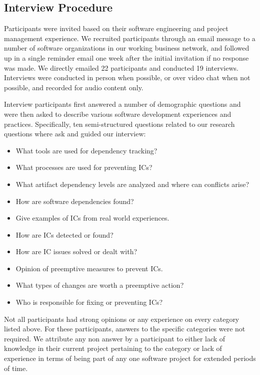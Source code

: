 \documentclass[conference]{IEEEtran}
\begin{document}
\subsection{Interview Procedure}

Participants were invited based on their software engineering and project management experience. We recruited participants through an email message to a number of software organizations in our working business network, and followed up in a single reminder email one week
after the initial invitation if no response was made. We directly emailed 22 participants and  conducted
19 interviews. Interviews were conducted in person when possible, or over video chat when not possible, and recorded for audio content only.


Interview participants first answered a number of demographic questions and were then asked to describe various software development experiences and practices.
Specifically, ten semi-structured questions related to our research questions where ask and guided our interview:

\begin{itemize}
\item What tools are used for dependency tracking?
\item What processes are used for preventing ICs?
\item What artifact dependency levels are analyzed and where can conflicts arise?
\item How are software dependencies found?
\item Give examples of ICs from real world experiences.
\item How are ICs detected or found?
\item How are IC issues solved or dealt with?
\item Opinion of preemptive measures to prevent ICs.
\item What types of changes are worth a preemptive action?
\item Who is responsible for fixing or preventing ICs?
\end{itemize}

Not all participants had strong opinions or any experience on every category listed above. For these participants, answers
to the specific categories were not required. We attribute any non answer by a participant to
either lack of knowledge in their current project pertaining to the category or lack of experience in terms of
being part of any one software project for extended periods of time.
\end{document}
